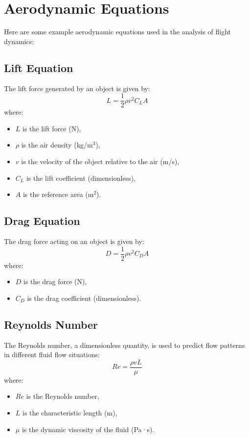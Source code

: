 
\section{Aerodynamic Equations}
Here are some example aerodynamic equations used in the analysis of flight dynamics:

\subsection{Lift Equation}
The lift force generated by an object is given by:
\begin{equation}
    L = \frac{1}{2} \rho v^2 C_L A
\end{equation}
where:
\begin{itemize}
    \item $L$ is the lift force (N),
    \item $\rho$ is the air density (kg/m\(^3\)),
    \item $v$ is the velocity of the object relative to the air (m/s),
    \item $C_L$ is the lift coefficient (dimensionless),
    \item $A$ is the reference area (m\(^2\)).
\end{itemize}

\subsection{Drag Equation}
The drag force acting on an object is given by:
\begin{equation}
    D = \frac{1}{2} \rho v^2 C_D A
\end{equation}
where:
\begin{itemize}
    \item $D$ is the drag force (N),
    \item $C_D$ is the drag coefficient (dimensionless).
\end{itemize}

\subsection{Reynolds Number}
The Reynolds number, a dimensionless quantity, is used to predict flow patterns in different fluid flow situations:
\begin{equation}
    Re = \frac{\rho v L}{\mu}
\end{equation}
where:
\begin{itemize}
    \item $Re$ is the Reynolds number,
    \item $L$ is the characteristic length (m),
    \item $\mu$ is the dynamic viscosity of the fluid (Pa·s).
\end{itemize}

